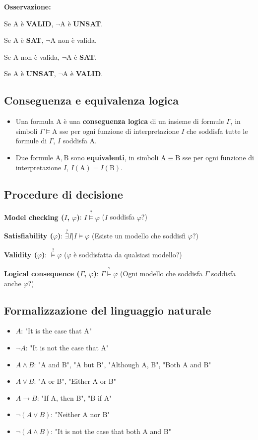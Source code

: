 \textbf{Osservazione:}

Se $\mathrm{A}$ è \textbf{VALID}, $\lnot \mathrm{A}$ è \textbf{UNSAT}.

Se $\mathrm{A}$ è \textbf{SAT}, $\lnot \mathrm{A}$ non è valida.

Se $\mathrm{A}$ non è valida, $\lnot \mathrm{A}$ è \textbf{SAT}.

Se $\mathrm{A}$ è \textbf{UNSAT}, $\lnot \mathrm{A}$ è \textbf{VALID}. 


\subsection{Conseguenza e equivalenza logica}
\begin{itemize}
\item Una formula $\mathrm{A}$ è una \textbf{conseguenza logica} di un insieme di formule $\Gamma$, in simboli $\Gamma \models \mathrm{A}$ sse per ogni funzione di interpretazione $I$ che soddisfa tutte le formule di $\Gamma$, $I$ soddisfa $\mathrm{A}$.

\item Due formule $\mathrm{A}, \mathrm{B}$ sono \textbf{equivalenti}, in simboli $\mathrm{A} \equiv \mathrm{B}$ sse per ogni funzione di interpretazione $I$, $I(\mathrm{A}) = I(\mathrm{B})$. 
\end{itemize}

\subsection{Procedure di decisione}

\textbf{Model checking ($I$, $\varphi$)}: $I \stackrel{?}{\models} \varphi$ ($I$ soddisfa $\varphi$?)

\textbf{Satisfiability ($\varphi$)}: $\stackrel{?}{\exists} I | I \models \varphi$ (Esiste un modello che soddisfi $\varphi$?)

\textbf{Validity ($\varphi$)}: $\stackrel{?}{\models} \varphi$ ($\varphi$ è soddisfatta da qualsiasi modello?)

\textbf{Logical consequence ($\Gamma$, $\varphi$)}: $\Gamma \stackrel{?}{\models} \varphi$ (Ogni modello che soddisfa $\Gamma$ soddisfa anche $\varphi$?)

\subsection{Formalizzazione del linguaggio naturale}

\begin{itemize}
\item $A$: "It is the case that A"
\item $\lnot A$: "It is not the case that A"
\item $A \land B$: "A and B", "A but B", "Although A, B", "Both A and B"
\item $A \lor B$: "A or B", "Either A or B"
\item $A \to B$: "If A, then B", "B if A"
\item $\lnot (A \lor B)$: "Neither A nor B"
\item $\lnot (A \land B)$: "It is not the case that both A and B"
\end{itemize}